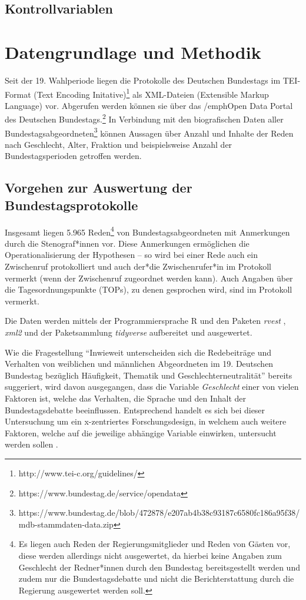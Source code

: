 \documentclass[12pt, 
    twoside=false, 
    bibliography=totoc, 
    numbers=endperiod, 
    headings=normal, 
    toc=chapterentrydotfill
    ]{scrbook}
\begin{document}
\section{Kontrollvariablen}

\chapter{Datengrundlage und Methodik}

Seit der 19. Wahlperiode liegen die Protokolle des Deutschen Bundestags im TEI-Format (Text Encoding Initative)\footnote{http://www.tei-c.org/guidelines/} als XML-Dateien (Extensible Markup Language) vor. Abgerufen werden können sie über das /emph{Open Data Portal} des Deutschen Bundestags.\footnote{https://www.bundestag.de/service/opendata} In Verbindung mit den biografischen Daten aller Bundestagsabgeordneten\footnote{https://www.bundestag.de/blob/472878/e207ab4b38c93187c6580fc186a95f38/mdb-stammdaten-data.zip} können Aussagen über Anzahl und Inhalte der Reden nach Geschlecht, Alter, Fraktion und beispielsweise Anzahl der Bundestagsperioden getroffen werden.

\section{Vorgehen zur Auswertung der Bundestagsprotokolle}


Insgesamt liegen 5.965 Reden\footnote{Es liegen auch Reden der Regierungsmitglieder und Reden von Gästen vor, diese werden allerdings nicht ausgewertet, da hierbei keine Angaben zum Geschlecht der Redner*innen durch den Bundestag bereitsgestellt werden und zudem nur die Bundestagsdebatte und nicht die Berichterstattung durch die Regierung ausgewertet werden soll.} von Bundestagsabgeordneten mit Anmerkungen durch die Stenograf*innen vor. Diese Anmerkungen ermöglichen die Operationalisierung der Hypothesen -- so wird bei einer Rede auch ein Zwischenruf protokolliert und auch der*die Zwischenrufer*in im Protokoll vermerkt (wenn der Zwischenruf zugeordnet werden kann). Auch Angaben über die Tagesordnungspunkte (TOPs), zu denen gesprochen wird, sind im Protokoll vermerkt.

Die Daten werden mittels der Programmiersprache R \parencite{rcoreteam_2018} und den Paketen \emph{rvest} \parencite{wickham_2016}, \emph{xml2} \parencite{wickham_2018} und der Paketsammlung \emph{tidyverse} \parencite{wickham_2017} aufbereitet und ausgewertet.


Wie die Fragestellung \enquote{Inwieweit unterscheiden sich die Redebeiträge und Verhalten von weiblichen und männlichen
Abgeordneten im 19. Deutschen Bundestag bezüglich Häufigkeit, Thematik und Geschlechterneutralität} bereits suggeriert, wird davon ausgegangen, dass die Variable \emph{Geschlecht} einer von vielen Faktoren ist, welche das Verhalten, die Sprache und den Inhalt der Bundestagsdebatte beeinflussen. Entsprechend handelt es sich bei dieser Untersuchung um ein x-zentriertes Forschungsdesign, in welchem auch weitere Faktoren, welche auf die jeweilige abhängige Variable einwirken, untersucht werden sollen  \parencites[vgl.][3f.]{ganghof_2005}.
\end{document}
